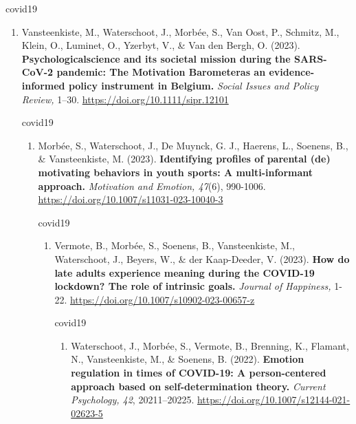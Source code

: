 \documentclass[
  twocolumn]{article}
\providecommand{\tightlist}{%
  \setlength{\itemsep}{0pt}\setlength{\parskip}{0pt}}
\begin{document}
\begin{enumerate}
\begin{enumerate}
\begin{enumerate}
\begin{enumerate}
        covid19

        \begin{enumerate}
        \def\labelenumv{\arabic{enumv}.}
        \tightlist
        \item
          Vansteenkiste, M., Waterschoot, J., Morbée, S., Van Oost, P.,
          Schmitz, M., Klein, O., Luminet, O., Yzerbyt, V., \& Van den
          Bergh, O. (2023). \textbf{Psychologicalscience and its
          societal mission during the SARS-CoV-2 pandemic: The
          Motivation Barometeras an evidence-informed policy instrument
          in Belgium.} \emph{Social Issues and Policy Review,} 1--30.
          \url{https://doi.org/10.1111/sipr.12101}

          covid19

          \begin{enumerate}
          \def\labelenumvi{\arabic{enumvi}.}
          \tightlist
          \item
            Morbée, S., Waterschoot, J., De Muynck, G. J., Haerens, L.,
            Soenens, B., \& Vansteenkiste, M. (2023).
            \textbf{Identifying profiles of parental (de) motivating
            behaviors in youth sports: A multi-informant approach.}
            \emph{Motivation and Emotion, 47}(6), 990-1006.
            \url{https://doi.org/10.1007/s11031-023-10040-3}

            covid19

            \begin{enumerate}
            \def\labelenumvii{\arabic{enumvii}.}
            \tightlist
            \item
              Vermote, B., Morbée, S., Soenens, B., Vansteenkiste, M.,
              Waterschoot, J., Beyers, W., \& der Kaap-Deeder, V.
              (2023). \textbf{How do late adults experience meaning
              during the COVID-19 lockdown? The role of intrinsic
              goals.} \emph{Journal of Happiness,} 1-22.
              \url{https://doi.org/10.1007/s10902-023-00657-z}

              covid19

              \begin{enumerate}
              \def\labelenumviii{\arabic{enumviii}.}
              \tightlist
              \item
                Waterschoot, J., Morbée, S., Vermote, B., Brenning, K.,
                Flamant, N., Vansteenkiste, M., \& Soenens, B. (2022).
                \textbf{Emotion regulation in times of COVID-19: A
                person-centered approach based on self-determination
                theory.} \emph{Current Psychology, 42}, 20211--20225.
                \url{https://doi.org/10.1007/s12144-021-02623-5}


\end{enumerate}
\end{enumerate}
\end{enumerate}
\end{enumerate}
\end{enumerate}
\end{enumerate}
\end{enumerate}
\end{enumerate}
\end{document}
